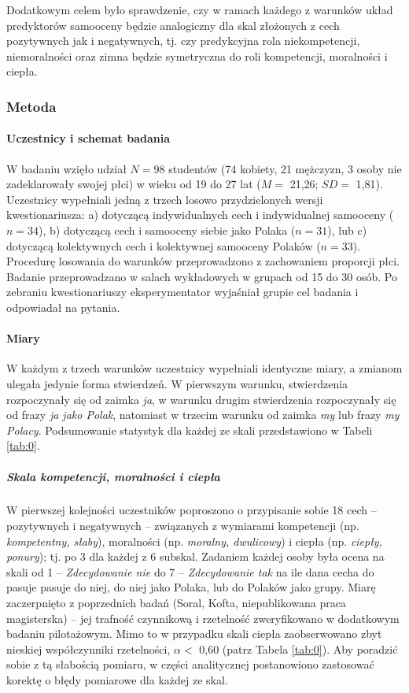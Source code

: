 \documentclass[man]{apa6}
\begin{document}
Dodatkowym celem było sprawdzenie, czy w ramach każdego z warunków układ predyktorów samooceny będzie analogiczny dla skal złożonych z cech pozytywnych jak i negatywnych, tj. czy predykcyjna rola niekompetencji, niemoralności oraz zimna będzie symetryczna do roli kompetencji, moralności i ciepła.

\subsubsection{Metoda}

\paragraph{Uczestnicy i schemat badania}
W badaniu wzięło udział $N=98$ studentów (74 kobiety, 21 mężczyzn, 3 osoby nie zadeklarowały swojej płci) w wieku od 19 do 27 lat ($M = $ 21,26; $SD =$ 1,81). Uczestnicy wypełniali jedną z trzech losowo przydzielonych wersji kwestionariusza: a) dotyczącą indywidualnych cech i indywidualnej samooceny ($n = 34$), b) dotyczącą cech i samooceny siebie jako Polaka ($n = 31$), lub c) dotyczącą kolektywnych cech i kolektywnej samooceny Polaków ($n = 33$). Procedurę losowania do warunków przeprowadzono z zachowaniem proporcji płci. Badanie przeprowadzano w salach wykładowych w grupach od 15 do 30 osób. Po zebraniu kwestionariuszy eksperymentator wyjaśniał grupie cel badania i odpowiadał na pytania.

\paragraph{Miary}
W każdym z trzech warunków uczestnicy wypełniali identyczne miary, a zmianom ulegała jedynie forma stwierdzeń. W pierwszym warunku, stwierdzenia rozpoczynały się od zaimka \emph{ja}, w warunku drugim stwierdzenia rozpoczynały się od frazy \emph{ja jako Polak}, natomiast w trzecim warunku od zaimka \emph{my} lub frazy \emph{my Polacy}. Podsumowanie statystyk dla każdej ze skali przedstawiono w Tabeli \ref{tab:0}.

\subparagraph{Skala kompetencji, moralności i ciepła}
W pierwszej kolejności uczestników poproszono o przypisanie sobie 18 cech -- pozytywnych i negatywnych -- związanych z wymiarami kompetencji (np. \emph{kompetentny, słaby}), moralności (np. \emph{moralny, dwulicowy}) i ciepła (np. \emph{ciepły, ponury}); tj. po 3 dla każdej z 6 subskal. Zadaniem każdej osoby była ocena na skali od 1 -- \emph{Zdecydowanie nie} do 7 -- \emph{Zdecydowanie tak} na ile dana cecha do pasuje pasuje do niej, do niej jako Polaka, lub do Polaków jako grupy. Miarę zaczerpnięto z poprzednich badań (Soral, Kofta, niepublikowana praca magisterska) -- jej trafność czynnikową i rzetelność zweryfikowano w dodatkowym badaniu pilotażowym. Mimo to w przypadku skali ciepła zaobserwowano zbyt nieskiej współczynniki rzetelności, $\alpha < $ 0,60  (patrz Tabela \ref{tab:0}). Aby poradzić sobie z tą słabością pomiaru, w części analitycznej postanowiono zastosować korektę o błędy pomiarowe dla każdej ze skal.
\end{document}
